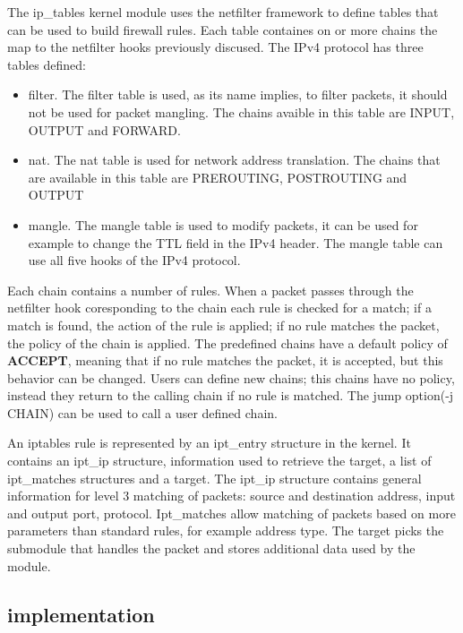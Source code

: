 The ip_tables kernel module uses the netfilter framework to define tables that can be used to build firewall rules.
Each table containes on or more chains the map to the netfilter hooks previously discused. 
The IPv4 protocol has three tables defined:
\begin{itemize}
  \item filter. The filter table is used, as its name implies, to filter packets, it should not be used for packet mangling. The chains
avaible in this table are INPUT, OUTPUT and FORWARD.
  \item nat. The nat table is used for network address translation. The chains that are available in this table are PREROUTING,
 POSTROUTING and OUTPUT
  \item mangle. The mangle table is used to modify packets, it can be used for example to change the TTL field in
the IPv4 header. The mangle table can use all five hooks of the IPv4 protocol.
\end{itemize}

Each chain contains a number of rules. When a packet passes through the netfilter hook coresponding to the chain each rule is checked
for a match; if a match is found, the action of the rule is applied; if no rule matches the packet, the policy of the chain is applied.
The predefined chains have a default policy of \textbf{ACCEPT}, meaning that if no rule matches the packet, it is accepted, but this behavior
can be changed. Users can define new chains; this chains have no policy, instead they return to the calling chain if no rule is matched.
The jump option(-j CHAIN) can be used to call a user defined chain.

An iptables rule is represented by an ipt_entry structure in the kernel. It contains an ipt_ip structure, information used
to retrieve the target, a list of ipt_matches structures and a target. The ipt_ip structure contains general information for
level 3 matching of packets: source and destination address, input and output port, protocol. Ipt_matches allow matching of
packets based on more parameters than standard rules, for example address type. The target picks the submodule that handles the 
packet and stores additional data used by the module.

\subsection{\text{\project} implementation}
\label{sub-sec:firewall-lkl}

